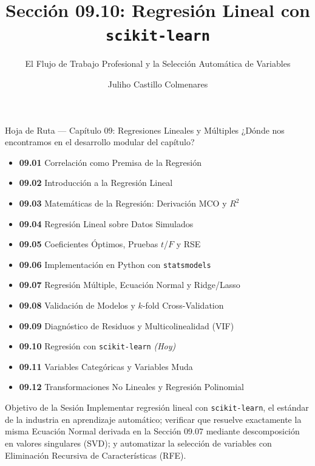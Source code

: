 \documentclass[10pt, aspectratio=169]{beamer}
\title[Regresión con scikit-learn]{Sección 09.10: Regresión Lineal con \texttt{scikit-learn}}
\subtitle{El Flujo de Trabajo Profesional y la Selección Automática de Variables}
\author[J. Castillo Colmenares]{Juliho Castillo Colmenares}
\institute{Tecnológico de Monterrey}
\date{\vspace{-1.2cm}}
\begin{document}
\begin{frame}[plain]
  \vspace{-0.8cm}
  \titlepage
\end{frame}

\begin{frame}{Hoja de Ruta --- Capítulo 09: Regresiones Lineales y Múltiples}
  \scriptsize
  ¿Dónde nos encontramos en el desarrollo modular del capítulo?
  \begin{itemize}\itemsep=0.02em
    \item \textbf{09.01} Correlación como Premisa de la Regresión
    \item \textbf{09.02} Introducción a la Regresión Lineal
    \item \textbf{09.03} Matemáticas de la Regresión: Derivación MCO y $R^2$
    \item \textbf{09.04} Regresión Lineal sobre Datos Simulados
    \item \textbf{09.05} Coeficientes Óptimos, Pruebas $t$/$F$ y RSE
    \item \textbf{09.06} Implementación en Python con \texttt{statsmodels}
    \item \textbf{09.07} Regresión Múltiple, Ecuación Normal y Ridge/Lasso
    \item \textbf{09.08} Validación de Modelos y $k$-fold Cross-Validation
    \item \textbf{09.09} Diagnóstico de Residuos y Multicolinealidad (VIF)
    \item \textbf{09.10} Regresión con \texttt{scikit-learn} \emph{(Hoy)}
    \item \textbf{09.11} Variables Categóricas y Variables Muda
    \item \textbf{09.12} Transformaciones No Lineales y Regresión Polinomial
  \end{itemize}
  \pause
  \vspace{-0.05cm}
  \begin{block}{Objetivo de la Sesión}
    Implementar regresión lineal con \texttt{scikit-learn}, el estándar de la industria en aprendizaje automático; verificar que resuelve exactamente la misma Ecuación Normal derivada en la Sección 09.07 mediante descomposición en valores singulares (SVD); y automatizar la selección de variables con Eliminación Recursiva de Características (RFE).
  \end{block}
\end{frame}
\end{document}
